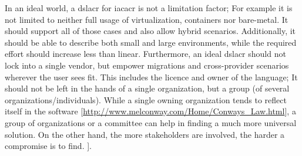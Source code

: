 In an ideal world, a \gls{dslacr} for \gls{iacacr} is not a limitation factor; For example it is not limited to neither full usage of virtualization, containers nor bare-metal. It should support all of those cases and also allow hybrid scenarios. Additionally, it should be able to describe both small and large environments, while the required effort should increase less than linear. Furthermore, an ideal \gls{dslacr} should not lock into a single vendor, but empower migrations and cross-provider scenarios wherever the user sees fit. This includes the licence and owner of the language; It should not be left in the hands of a single organization, but a group (of several organizations/individuals). While a single owning organization tends to reflect itself in the software [\url{http://www.melconway.com/Home/Conways_Law.html}], a group of organizations or a committee can help in finding a much more universal solution. On the other hand, the more stakeholders are involved, the harder a compromise is to find.
].

